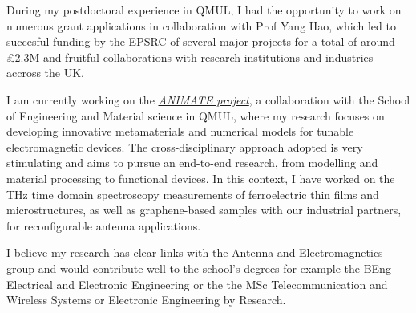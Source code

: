\documentclass{academia}
\begin{document}

During my postdoctoral experience in QMUL, I had the
opportunity to work on numerous grant applications in collaboration with Prof
Yang Hao, which led to succesful funding by the EPSRC of several major projects
for a total of around £2.3M and fruitful collaborations with research institutions
and industries accross the UK.

I am currently working on the \textit{\href{https://animate-research.com/}{ANIMATE project}},
a collaboration with the School of Engineering and Material science in QMUL,
where my research focuses on developing innovative metamaterials and
numerical models for tunable electromagnetic devices.
The cross-disciplinary approach adopted is very stimulating and aims to
pursue an end-to-end research, from modelling and material processing to
functional devices. In this context, I have worked on the THz time
domain spectroscopy measurements of ferroelectric thin films and microstructures,
as well as graphene-based samples with our industrial partners, for reconfigurable
antenna applications.


%
I believe my research has clear links with the Antenna and Electromagnetics 
group and would contribute well to the school's degrees for example 
the BEng Electrical and Electronic Engineering or the 
the MSc Telecommunication and Wireless Systems or Electronic Engineering by Research.
\end{document}
